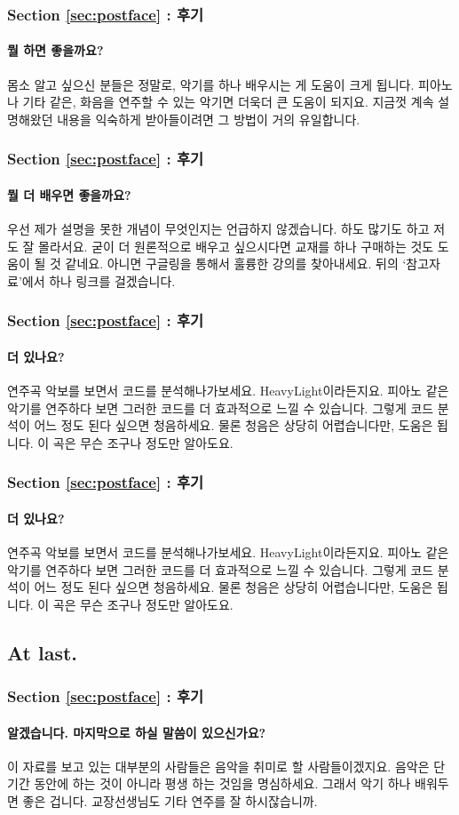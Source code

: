 \documentclass{beamer}
\begin{document}
	\begin{frame}
		\frametitle{Section \ref{sec:postface} : 후기}
		\framesubtitle{뭘 하면 좋을까요?}
		몸소 알고 싶으신 분들은 정말로, 악기를 하나 배우시는 게 도움이 크게 됩니다. 피아노나 기타 같은, 화음을 연주할 수 있는 악기면 더욱더 큰 도움이 되지요. 지금껏 계속 설명해왔던 내용을 익숙하게 받아들이려면 그 방법이 거의 유일합니다.
	\end{frame}
	
	\begin{frame}
		\frametitle{Section \ref{sec:postface} : 후기}
		\framesubtitle{뭘 더 배우면 좋을까요?}
		우선 제가 설명을 못한 개념이 무엇인지는 언급하지 않겠습니다. 하도 많기도 하고 저도 잘 몰라서요. 굳이 더 원론적으로 배우고 싶으시다면 교재를 하나 구매하는 것도 도움이 될 것 같네요. 아니면 구글링을 통해서 훌륭한 강의를 찾아내세요. 뒤의 `참고자료'에서 하나 링크를 걸겠습니다. 
	\end{frame}
	
	\begin{frame}
		\frametitle{Section \ref{sec:postface} : 후기}
		\framesubtitle{더 있나요?}
		연주곡 악보를 보면서 코드를 분석해나가보세요. HeavyLight이라든지요. 피아노 같은 악기를 연주하다 보면 그러한 코드를 더 효과적으로 느낄 수 있습니다. 그렇게 코드 분석이 어느 정도 된다 싶으면 청음하세요. 물론 청음은 상당히 어렵습니다만, 도움은 됩니다. 이 곡은 무슨 조구나 정도만 알아도요.
	\end{frame}
	
	\begin{frame}
		\frametitle{Section \ref{sec:postface} : 후기}
		\framesubtitle{더 있나요?}
		연주곡 악보를 보면서 코드를 분석해나가보세요. HeavyLight이라든지요. 피아노 같은 악기를 연주하다 보면 그러한 코드를 더 효과적으로 느낄 수 있습니다. 그렇게 코드 분석이 어느 정도 된다 싶으면 청음하세요. 물론 청음은 상당히 어렵습니다만, 도움은 됩니다. 이 곡은 무슨 조구나 정도만 알아도요.
	\end{frame}
	
	\subsection{At last.}
	\begin{frame}
		\frametitle{Section \ref{sec:postface} : 후기}
		\framesubtitle{알겠습니다. 마지막으로 하실 말씀이 있으신가요?}
		이 자료를 보고 있는 대부분의 사람들은 음악을 취미로 할 사람들이겠지요. 음악은 단기간 동안에 하는 것이 아니라 평생 하는 것임을 명심하세요. 그래서 악기 하나 배워두면 좋은 겁니다. 교장선생님도 기타 연주를 잘 하시잖습니까.
	\end{frame}
	
\end{document}
